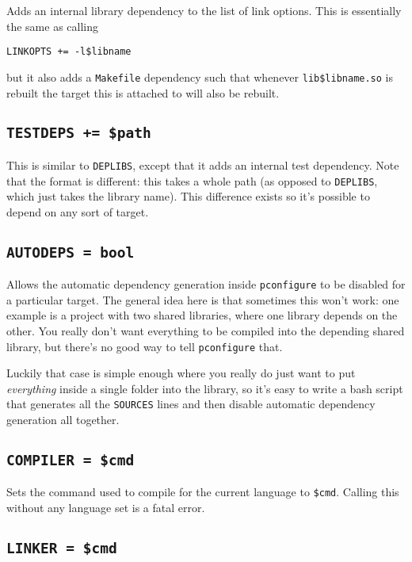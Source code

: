 \documentclass{article}
\begin{document}
Adds an internal library dependency to the list of link options.  This
is essentially the same as calling
\begin{verbatim}
LINKOPTS += -l$libname
\end{verbatim}
but it also adds a \texttt{Makefile} dependency such that whenever
\texttt{lib\$libname.so} is rebuilt the target this is attached to
will also be rebuilt.

\subsection{\texttt{TESTDEPS += \$path}}

This is similar to \texttt{DEPLIBS}, except that it adds an internal
test dependency.  Note that the format is different: this takes a
whole path (as opposed to \texttt{DEPLIBS}, which just takes the
library name).  This difference exists so it's possible to depend on
any sort of target.

\subsection{\texttt{AUTODEPS = bool} \label{cmd:autodeps}}

Allows the automatic dependency generation inside \texttt{pconfigure}
to be disabled for a particular target.  The general idea here is that
sometimes this won't work: one example is a project with two shared
libraries, where one library depends on the other.  You really don't
want everything to be compiled into the depending shared library, but
there's no good way to tell \texttt{pconfigure} that.

Luckily that case is simple enough where you really do just want to
put \textit{everything} inside a single folder into the library, so
it's easy to write a bash script that generates all the
\texttt{SOURCES} lines and then disable automatic dependency
generation all together.

\subsection{\texttt{COMPILER = \$cmd}}

Sets the command used to compile for the current language to
\texttt{\$cmd}.  Calling this without any language set is a fatal
error.

\subsection{\texttt{LINKER = \$cmd}}
\end{document}

